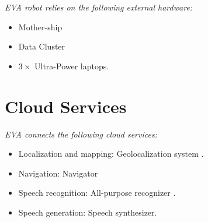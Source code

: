 \textit{EVA robot relies on the following external hardware:}

\begin{itemize}
	\item \BnL Mother-ship
	\item \BnL Data Cluster
	\item $3 \times$ \BnL Ultra-Power laptops.
\end{itemize}

\section*{Cloud Services}

\textit{EVA connects the following cloud services:}
\begin{itemize}
	\item Localization and mapping: \BnL Geolocalization system \cite{bnl3}.
	\item Navigation: \BnL Navigator
	\item Speech recognition: \BnL All-purpose recognizer \cite{bnl1}.
	\item Speech generation: \BnL Speech synthesizer.
\end{itemize}
